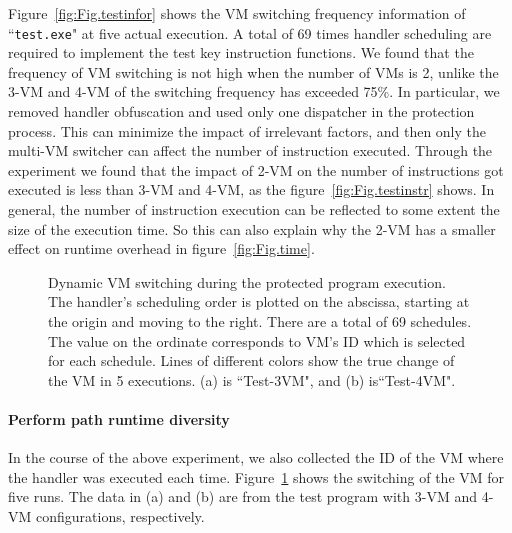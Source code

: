 \documentclass[preprint,12pt,3p]{elsarticle}
\begin{document}
Figure~\ref{fig:Fig.testinfor} shows the VM switching frequency information of ``\texttt{test.exe}" at five actual execution. A total of 69 times handler scheduling are required to implement the test key instruction functions.
We found that the frequency of VM switching is not high when the number of VMs is 2,
unlike the 3-VM and 4-VM of the switching frequency has exceeded 75\%.
In particular, we removed handler obfuscation and used only one dispatcher in the protection process.
This can minimize the impact of irrelevant factors, and then only the multi-VM switcher can affect the number of instruction executed.
Through the experiment we found that the impact of 2-VM on the number of instructions got executed is less than 3-VM and 4-VM,
as the figure~\ref{fig:Fig.testinstr} shows.
In general, the number of instruction execution can be reflected to some extent the size of the execution time.
So this can also explain why the 2-VM has a smaller effect on runtime overhead in figure~\ref{fig:Fig.time}.

\begin{figure}[t]
\centering
{}
\caption{Dynamic VM switching during the protected program execution. The handler's scheduling order is plotted on the abscissa, starting at the origin and moving to the right. There are a total of 69 schedules. The value on the ordinate corresponds to VM's ID which is selected for each schedule. Lines of different colors show the true change of the VM in 5 executions. (a) is ``Test-3VM", and (b) is``Test-4VM". }\label{fig:Fig.exec3vm}
\end{figure}

\paragraph*{Perform path runtime diversity}
In the course of the above experiment, we also collected the ID of the VM where the handler was executed each time. 
Figure~\ref{fig:Fig.exec3vm} shows the switching of the VM for five runs. 
The data in (a) and (b) are from the test program with 3-VM and 4-VM configurations, respectively. 
\end{document}
